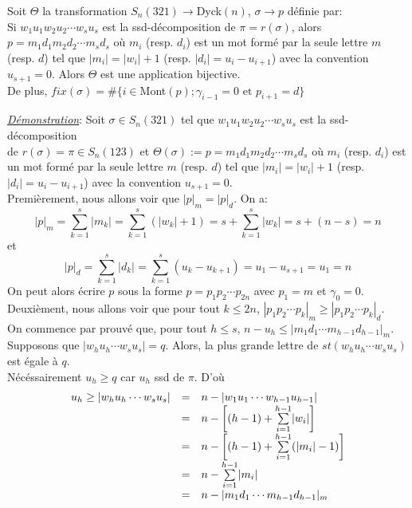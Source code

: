 \begin{proposition} \label{dyck_to_avoiding_321_tfsm}
	Soit $\Theta$ la transformation $S_{n}(321)\longrightarrow $\rm{Dyck}$(n)$, $\sigma \longrightarrow p$ définie par:\\
	Si $w_{1}u_{1}w_{2}u_2 \cdots w_{s}u_{s}$ est la ssd-décomposition de $\pi=r(\sigma)$, alors $p=m_{1}d_{1}m_{2}d_{2}\cdots m_{s}d_{s}$ où $m_{i}$ (resp. $d_{i}$) est un mot formé par la seule lettre $m$ (resp. $d$) tel que $|m_{i}| = |w_{i}|+1$ (resp. $|d_{i}| = u_{i}-u_{i+1}$) avec la convention $u_{s+1}=0$. Alors $\Theta$ est une application bijective.\\
	De plus, $fix(\sigma)= \#\{i \in $\rm{Mont}$(p); \gamma_{i-1}=0 \text{ et } p_{i+1}=d\}$
\end{proposition}

\underline{\textit{Démonstration}}:
Soit $\sigma\in S_{n}(321)$ tel que $w_{1}u_{1}w_{2}u_2 \cdots w_{s}u_{s}$ est la ssd-décomposition \\ de $r(\sigma)=\pi \in S_{n}(123)$  et $\Theta(\sigma):=p=m_{1}d_{1}m_{2}d_{2}\cdots m_{s}d_{s}$ où  $m_{i}$ (resp. $d_{i}$) est un mot formé par la seule lettre $m$ (resp. $d$) tel que $|m_{i}| = |w_{i}|+1$ (resp. $|d_{i}| = u_{i}-u_{i+1}$) avec la convention $u_{s+1}=0$.\vspace{10pt}\\
Premièrement, nous allons voir que $|p|_{m} = |p|_{d}$. On a:
$$
	|p|_{m} = \underset{k=1}{\overset{s}{\sum}}|m_{k}| = \underset{k=1}{\overset{s}{\sum}}(|w_{k}|+1)=s+\underset{k=1}{\overset{s}{\sum}}|w_{k}| = s+(n-s)=n
$$
et
$$
	|p|_{d} = \underset{k=1}{\overset{s}{\sum}}|d_{k}| = \underset{k=1}{\overset{s}{\sum}}(u_{k}-u_{k+1}) = u_{1} - u_{s+1}=u_{1}=n
$$
On peut alors écrire $p$ sous la forme $p=p_{1}p_{2}\cdots p_{2n}$ avec $p_{1}=m$ et  $\gamma_{0}=0$.\vspace{10pt}\\
Deuxièment, nous allons voir que pour tout $k\leq 2n$, $|p_{1}p_{2}\cdots p_{k}|_{m}\geq |p_{1}p_{2}\cdots p_{k}|_{d}$.\\
On commence par prouvé que, pour tout $h\leq s$, $n-u_{h}\leq |m_{1}d_{1}\cdots m_{h-1}d_{h-1} |_{m}$.\\
Supposons que $| w_{h}u_{h}\cdots w_{s}u_{s} |=q$. Alors, la plus grande lettre de $st(w_{h}u_{h}\cdots w_{s}u_{s})$  est égale à $q$.\\ Nécéssairement $u_{h}\geq q$ car $u_{h}$ ssd de $\pi$. D'où
\[\begin{array}{l l l}
		u_{h}\geq | w_{h}u_{h}\cdots w_{s}u_{s} | & = & n-| w_{1}u_{1}\cdots w_{h-1}u_{h-1} |                                 \\
		                                          & = & n-\left[ (h-1)+ \underset{i=1}{\overset{h-1}{\sum}}|w_{i}|\right]     \\
		                                          & = & n-\left[ (h-1)+ \underset{i=1}{\overset{h-1}{\sum}}(|m_{i}|-1)\right] \\
		                                          & = & n- \underset{i=1}{\overset{h-1}{\sum}}|m_{i}|                         \\
		                                          & = & n - | m_{1}d_{1}\cdots m_{h-1}d_{h-1} |_{m}
	\end{array}
\]
